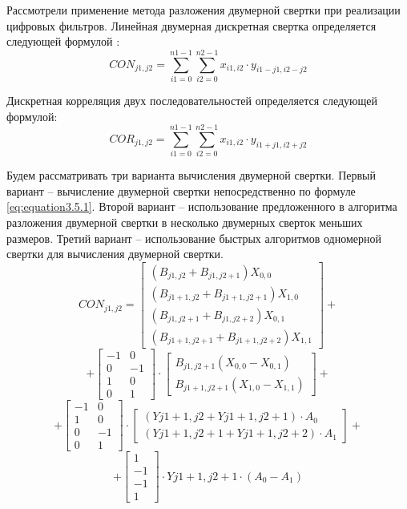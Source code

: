 Рассмотрели применение метода разложения двумерной свертки при
реализации цифровых фильтров. Линейная двумерная дискретная свертка определяется следующей формулой \cite{decomposition_method_application2017}:
\begin{equation}
	\label{eq:equation3.5.1}
	CON_{j1,j2} = \sum_{i1 =0}^{n1-1} \sum_{i2 =0}^{n2-1} x_{i1,i2} \cdot y_{i1-j1,i2-j2}
\end{equation} 

Дискретная корреляция двух последовательностей определяется следующей формулой: 
\begin{equation}
	\label{eq:equation3.5.2}
	COR_{j1,j2} = \sum_{i1 =0}^{n1-1} \sum_{i2 =0}^{n2-1} x_{i1,i2} \cdot y_{i1+j1,i2+j2}
\end{equation}

Будем рассматривать три варианта вычисления двумерной свертки. Первый вариант – вычисление двумерной свертки непосредственно по формуле \ref{eq:equation3.5.1}. Второй вариант – использование предложенного в \cite{550562} алгоритма разложения двумерной свертки в несколько двумерных сверток меньших размеров. Третий вариант – использование быстрых алгоритмов одномерной свертки \cite{MOU1987377} для вычисления двумерной свертки.
$$
	CON_{j1,j2} = 
	\begin{bmatrix}
		\left( {B_{j1,j2} + B_{j1,j2+1}} \right) X_{0,0} \\
		\left( {B_{j1+1,j2} + B_{j1+1,j2+1}} \right) X_{1,0} \\
		\left( {B_{j1,j2+1} + B_{j1,j2+2}} \right) X_{0,1} \\
		\left( {B_{j1+1,j2+1} + B_{j1+1,j2+2}} \right) X_{1,1}
	\end{bmatrix}
	+
$$
$$
+
	\begin{bmatrix}
		-1 & 0 \\
		0 & -1 \\
		1 & 0  \\
		0 & 1	
	\end{bmatrix}
	\cdot
	\begin{bmatrix}
		B_{j1,j2+1} \left( {X_{0,0} - X_{0,1}} \right) \\
		B_{j1+1,j2+1} \left( {X_{1,0} - X_{1,1}} \right)	
	\end{bmatrix}
	+
$$
$$
	+ 
	\begin{bmatrix}
		-1 & 0 \\
		1 & 0 \\
		0 & -1  \\
		0 & 1	
	\end{bmatrix}
	\cdot
	\begin{bmatrix}
		\left(	{Y{j1+1,j2} + Y{j1+1,j2+1}} \right) \cdot A_0 \\
		\left(	{Y{j1+1,j2+1} + Y{j1+1,j2+2}} \right) \cdot A_1	
	\end{bmatrix}
	+
$$
\begin{equation}
\label{eq:equation3.5.13}
	+
	\begin{bmatrix}
		1 \\ -1 \\ -1 \\ 1
	\end{bmatrix}
	\cdot
	Y{j1+1,j2+1}
	\cdot
	(A_0 - A_1)
\end{equation}

